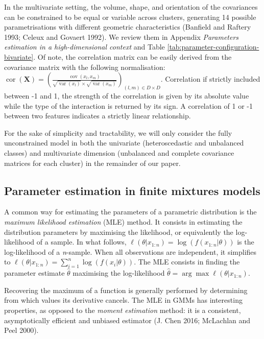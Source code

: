 In the multivariate setting, the volume, shape, and orientation of the covariances can be constrained to be equal or variable across clusters, generating 14 possible parametrisations with different geometric characteristics (Banfield and Raftery 1993; Celeux and Govaert 1992). We review them in Appendix \emph{Parameters estimation in a high-dimensional context} and Table \ref{tab:parameter-configuration-bivariate}. Of note, the
correlation matrix can be easily derived from the covariance
matrix with the following normalisation:
\(\operatorname{cor}(\boldsymbol{X})=\left(\frac{\operatorname{cov}(x_l, x_m)}{\sqrt{\operatorname{var}(x_l)} \times \sqrt{\operatorname{var}(x_m)}}\right)_{(l,m) \in D \times D}\). Correlation if strictly included between -1 and 1, the strength of the
correlation is given by its absolute value while the type of the
interaction is returned by its sign. A correlation of 1 or -1 between two features indicates a strictly linear relationship.

For the sake of simplicity and tractability, we will only consider the
fully unconstrained model in both the univariate (heteroscedastic and
unbalanced classes) and multivariate dimension (unbalanced and complete
covariance matrices for each cluster) in the remainder of our paper.

\hypertarget{parameter-estimation-in-finite-mixtures-models}{%
\subsection{Parameter estimation in finite mixtures models}\label{parameter-estimation-in-finite-mixtures-models}}

A common way for estimating the parameters of a parametric distribution is
the \emph{maximum likelihood estimation} (MLE) method. It consists in
estimating the distribution parameters by maximising the likelihood, or
equivalently the log-likelihood of a sample. In what follows,
\(\ell(\theta|x_{1:n})=\log (f(x_{1:n}|\theta))\) is the log-likelihood of
a \emph{n}-sample. When all observations are independent, it simplifies to
\(\ell(\theta|x_{1:n}) = \sum_{i=1}^n \log (f(x_i|\theta))\). The MLE
consists in finding the parameter estimate \(\hat{\theta}\) maximising the
log-likelihood \(\hat{\theta} = \arg \max \ell (\theta | x_{1:n})\).

Recovering the maximum of a function is generally performed by
determining from which values its derivative cancels. The MLE in GMMs
has interesting properties, as opposed to the \emph{moment estimation}
method: it is a consistent, asymptotically efficient and unbiased
estimator (J. Chen 2016; McLachlan and Peel 2000).


